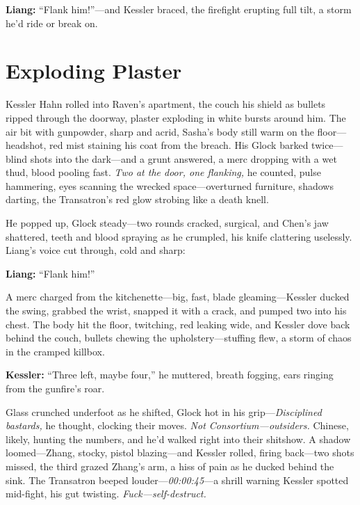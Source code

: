 \documentclass[12pt]{book}
\begin{document}
\vspace{0.5em}
\textbf{Liang:} “Flank him!”—and Kessler braced, the firefight erupting full tilt, a storm he’d ride or break on.

\vspace{1em}

\section{Exploding Plaster}

Kessler Hahn rolled into Raven’s apartment, the couch his shield as bullets ripped through the doorway, plaster exploding in white bursts around him. The air bit with gunpowder, sharp and acrid, Sasha’s body still warm on the floor—headshot, red mist staining his coat from the breach. His Glock barked twice—blind shots into the dark—and a grunt answered, a merc dropping with a wet thud, blood pooling fast. \emph{Two at the door, one flanking,} he counted, pulse hammering, eyes scanning the wrecked space—overturned furniture, shadows darting, the Transatron’s red glow strobing like a death knell.

He popped up, Glock steady—two rounds cracked, surgical, and Chen’s jaw shattered, teeth and blood spraying as he crumpled, his knife clattering uselessly. Liang’s voice cut through, cold and sharp: 

\vspace{0.5em}
\textbf{Liang:} “Flank him!”

A merc charged from the kitchenette—big, fast, blade gleaming—Kessler ducked the swing, grabbed the wrist, snapped it with a crack, and pumped two into his chest. The body hit the floor, twitching, red leaking wide, and Kessler dove back behind the couch, bullets chewing the upholstery—stuffing flew, a storm of chaos in the cramped killbox.

\vspace{0.5em}
\textbf{Kessler:} “Three left, maybe four,” he muttered, breath fogging, ears ringing from the gunfire’s roar.

Glass crunched underfoot as he shifted, Glock hot in his grip—\emph{Disciplined bastards,} he thought, clocking their moves. \emph{Not Consortium—outsiders.} Chinese, likely, hunting the numbers, and he’d walked right into their shitshow. A shadow loomed—Zhang, stocky, pistol blazing—and Kessler rolled, firing back—two shots missed, the third grazed Zhang’s arm, a hiss of pain as he ducked behind the sink. The Transatron beeped louder—\emph{00:00:45}—a shrill warning Kessler spotted mid-fight, his gut twisting. \emph{Fuck—self-destruct.}
\end{document}
